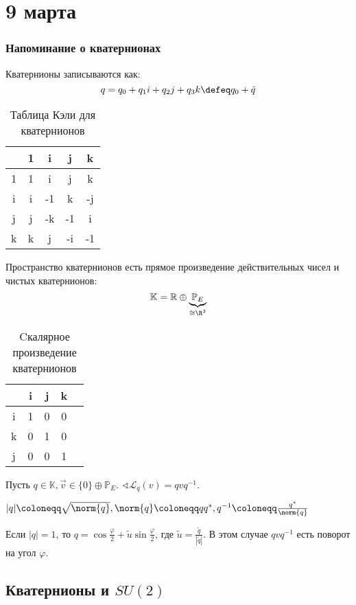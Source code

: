 \chapter{9 марта}

\subsection{Напоминание о кватернионах}

Кватернионы записываются как:
\[q = q_0 + q_1 i + q_2 j + q_3 k \defeq q_0 + \tilde{q}\]

\begin{table}[h]
	\centering
	\begin{tabular}{C|CCCC}
		\cdot & 1 & i  & j  & k  \\      & 1 & i  & j  & k  \\
		i     & i & -1 & k  & -j \\
		j     & j & -k & -1 & i  \\
		k     & k & j  & -i & -1
	\end{tabular}
	\caption{Таблица Кэли для кватернионов}
\end{table}

Пространство кватернионов есть прямое произведение действительных чисел и чистых кватернионов:
\[\mathbb{K} = \mathbb{R} \oplus \underbrace{\mathbb{P}_E}_{\cong \R^3}\]

\begin{table}[h]
	\centering
	\begin{tabular}{C|CCCC}
		\ev{\cdot, \cdot} & i & j & k \\ \hline
		i                 & 1 & 0 & 0 \\
		k                 & 0 & 1 & 0 \\
		j                 & 0 & 0 & 1
	\end{tabular}
	\caption{Cкалярное произведение кватернионов}
\end{table}

Пусть \(q \in \mathbb{K}, \vec{v} \in \{0\} \oplus \mathbb{P}_E\).
\(\sphericalangle \mathcal{L}_q(v) = q v q^{-1}\).

\(|q| \coloneqq \sqrt{\norm{q}}, \norm{q} \coloneqq q q^*, q^{-1} \coloneqq \frac{q^*}{\norm{q}}\)

Если \(|q| = 1\), то  \(q = \cos \frac{\varphi}{2} + \tilde{u} \sin \frac{\varphi}{2}\),
где \(\tilde{u} = \frac{\tilde{q}}{|\tilde{q}|}\).
В этом случае \(q v q^{-1}\) есть поворот на угол \(\varphi\).

\section{Кватернионы и \(SU(2)\)}

